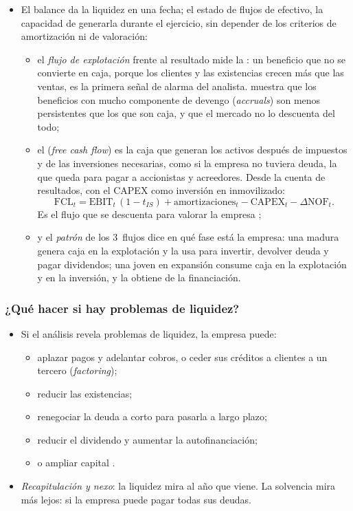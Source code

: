 \documentclass[11pt]{article}
\begin{document}
\begin{itemize}
\item El balance da la liquidez en una fecha; el estado de flujos de efectivo, la capacidad de generarla durante el ejercicio, sin depender de los criterios de amortización ni de valoración:
  \begin{itemize}
  \item el \emph{flujo de explotación} frente al resultado mide la : un beneficio que no se convierte en caja, porque los clientes y las existencias crecen más que las ventas, es la primera señal de alarma del analista. \textcite{Sloan1996Do} muestra que los beneficios con mucho componente de devengo (\emph{accruals}) son menos persistentes que los que son caja, y que el mercado no lo descuenta del todo;
  \item el  (\emph{free cash flow}) es la caja que generan los activos después de impuestos y de las inversiones necesarias, como si la empresa no tuviera deuda, la que queda para pagar a accionistas y acreedores. Desde la cuenta de resultados, con el CAPEX como inversión en inmovilizado:
    \[
    \mathrm{FCL}_t=\mathrm{EBIT}_t\,(1-t_{IS})+\text{amortizaciones}_t-\mathrm{CAPEX}_t-\Delta\mathrm{NOF}_t.
    \]
    Es el flujo que se descuenta para valorar la empresa ;
  \item y el \emph{patrón} de los 3~flujos dice en qué fase está la empresa: una madura genera caja en la explotación y la usa para invertir, devolver deuda y pagar dividendos; una joven en expansión consume caja en la explotación y en la inversión, y la obtiene de la financiación.
  \end{itemize}
\end{itemize}

\subsubsection{¿Qué hacer si hay problemas de liquidez?}\label{sec:problemas-liquidez}

\begin{itemize}
\item Si el análisis revela problemas de liquidez, la empresa puede:
  \begin{itemize}
  \item aplazar pagos y adelantar cobros, o ceder sus créditos a clientes a un tercero (\emph{factoring});
  \item reducir las existencias;
  \item renegociar la deuda a corto para pasarla a largo plazo;
  \item reducir el dividendo y aumentar la autofinanciación;
  \item o ampliar capital .
  \end{itemize}
\item \emph{Recapitulación y nexo}: la liquidez mira al año que viene. La solvencia mira más lejos: si la empresa puede pagar todas sus deudas.
\end{itemize}
\end{document}
